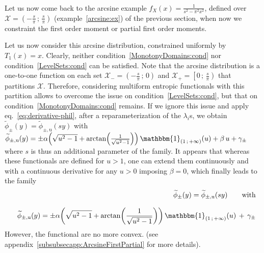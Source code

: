 \documentclass[entropy,article,submit,moreauthors,pdftex]{Definitions/mdpi}
\newcounter{arcsineExample}%
\def\X{\mathcal{X}}%
\def\un{\mathbbm{1}}%
\def\u{\mathrm{u}}
\begin{document}
\

Let us  now come  back to  the arcsine  example $f_X(x)  = \frac{1}{s^2  - \pi^2
  x^2}$,  defined over  $\X  =  \left( -  \frac{s}{\pi}  \,  ; \,  \frac{s}{\pi}
\right)$  (example~\ref{arcsine:ex})  of  the  previous  section,  when  now  we
constraint the first order moment or partial first order moments.

\setcounter{example}{0}
\renewcommand{\theexample}{\thearcsineExample-\arabic{example}}

\begin{Example}\label{arcsineUni:ex}
  Let  us  now consider  this  arcsine  distribution, constrained  uniformly  by
  $T_1(x)  =  x$.   Clearly,  neither  condition~\ref{MonotonyDomains:cond}  nor
  condition~\ref{LevelSets:cond}  can  be  satisfied.   Note  that  the  arcsine
  distribution  is  a  one-to-one  function  on   each  set  $\X_-  =  \left(  -
  \frac{s}{\pi} \, ;  \, 0 \right)$ and  $\X_+ = \left[ 0 \,  ; \, \frac{s}{\pi}
    \right)$ that  partitions $\X$.   Therefore, considering  multiform entropic
    functionals  with   this  partition   allows  to   overcome  the   issue  on
    condition~\ref{LevelSets:cond},            but            that            on
    condition~\ref{MonotonyDomains:cond} remains.   If we ignore this  issue and
    apply  eq.~\eqref{eq:derivative-phil},  after  a reparameterization  of  the
    $\lambda_i$s,        we       obtain        $\widetilde{\phi}_\pm(y)       =
    \widetilde{\phi}_{\pm,\u}(s  y)$  with $\widetilde{\phi}_{\pm,\u}(y)  =  \pm
    \alpha  \left(  \sqrt{u^2 -  1}  +  \arctan\left( \frac{1}{\sqrt{u^2  -  1}}
    \right) \right) \, \un_{( 1 \, ; \, +\infty )}(u) + \beta \, u + \gamma_\pm$
    where $s$  is thus an additional  parameter of the family.   It appears that
    whereas  these functionals  are defined  for $u  > 1$,  one can  extend them
    continuously  and with  a continuous  derivative for  any $u  > 0$  imposing
    $\beta = 0$, which finally leads to the family
  \begin{eqnarray*}
  &&\widetilde{\phi}_\pm(y) =  \widetilde{\phi}_{\pm,\u}(s y) \qquad \mbox{with}
  \\[2.5mm]
   && \widetilde{\phi}_{\pm,\u}(y) = \pm \alpha  \left( \sqrt{u^2 -
   1} + \arctan\left( \frac{1}{\sqrt{u^2 - 1}} \right)  \right)
  \, \un_{(  1 \, ;  \, +\infty )}(u) \, + \, \gamma_{\pm}
  \end{eqnarray*}
  However,     the     functional     are      no     more     convex.      (see
  appendix~\ref{subsubsecapp:ArcsineFirstPartial} for more details).
\end{Example}
\end{document}
